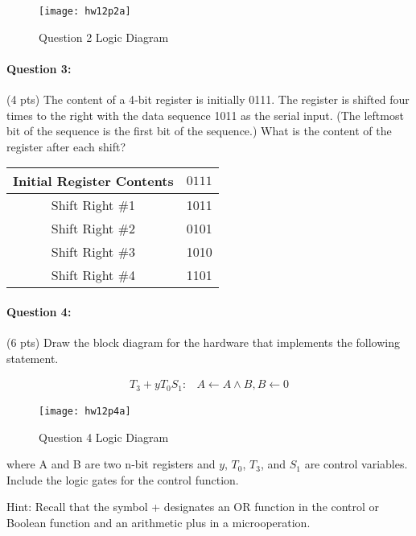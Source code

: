 \documentclass[12pt,letterpaper,titlepage]{report}
\begin{document}
\begin{raggedright}
\begin{figure}[ht]
  \centering
  \texttt{[image: hw12p2a]}
  \caption{Question 2 Logic Diagram}
\end{figure}

\paragraph{Question 3:}
(4 pts) The content of a 4‐bit register is initially 0111. The register is shifted four times to the right with the data sequence 1011 as the serial input. (The leftmost bit of the sequence is the first bit of the sequence.) What is the content of the register after each shift?

\begin{center}
\def\arraystretch{1.15} 
\begin{tabular}{|c|c|}\hline 
Initial Register Contents & $0111$ \\ \hline 
Shift Right \#1 & 1011 \\ \hline 
Shift Right \#2 & 0101 \\ \hline 
Shift Right \#3 & 1010 \\ \hline 
Shift Right \#4 & 1101 \\ \hline 
\end{tabular} 
\end{center}

\clearpage

\paragraph{Question 4:}
(6 pts) Draw the block diagram for the hardware that implements the following statement.

\begin{align*}
T_3+yT_0S_1:& A \gets A \land B, B \gets 0
\end{align*}

\begin{figure}[ht]
  \centering
  \texttt{[image: hw12p4a]}
  \caption{Question 4 Logic Diagram}
\end{figure}


where A and B are two n‐bit registers and $y$, $T_0$, $T_3$, and $S_1$ are control variables. Include the logic gates for the control function. 

Hint: Recall that the symbol + designates an OR function in the control or Boolean function and an arithmetic plus in a microoperation.


\end{raggedright}
\end{document}
